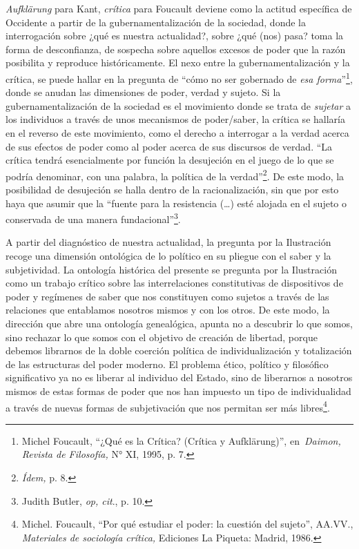 \emph{Aufklärung} para Kant, \emph{crítica} para Foucault deviene como la actitud específica de Occidente a partir de la gubernamentalización de la sociedad, donde la interrogación sobre ¿qué es nuestra actualidad?, sobre ¿qué (nos) pasa? toma la forma de desconfianza, de sospecha sobre aquellos excesos de poder que la razón posibilita y reproduce históricamente. El nexo entre la gubernamentalización y la crítica, se puede hallar en la pregunta de \enquote{cómo no ser gobernado de \emph{esa forma}}\footnote{Michel Foucault, \enquote{¿Qué es la Crítica? (Crítica y Aufklärung)}, en~\emph{Daimon, Revista de Filosofía,} N° XI, 1995, p. 7.}, donde se anudan las dimensiones de poder, verdad y sujeto. Si la gubernamentalización de la sociedad es el movimiento donde se trata de \emph{sujetar} a los individuos a través de unos mecanismos de poder/saber, la crítica se hallaría en el reverso de este movimiento, como el derecho a interrogar a la verdad acerca de sus efectos de poder como al poder acerca de sus discursos de verdad. \enquote{La crítica tendrá esencialmente por función la desujeción en el juego de lo que se podría denominar, con una palabra, la política de la verdad}\footnote{\emph{Ídem,} p. 8.}. De este modo, la posibilidad de desujeción se halla dentro de la racionalización, sin que por esto haya que asumir que la \enquote{fuente para la resistencia (\dots) esté alojada en el sujeto o conservada de una manera fundacional}\footnote{Judith Butler, \emph{op, cit}., p. 10.}.

A partir del diagnóstico de nuestra actualidad, la pregunta por la Ilustración recoge una dimensión ontológica de lo político en su pliegue con el saber y la subjetividad. La ontología histórica del presente se pregunta por la Ilustración como un trabajo crítico sobre las interrelaciones constitutivas de dispositivos de poder y regímenes de saber que nos constituyen como sujetos a través de las relaciones que entablamos nosotros mismos y con los otros. De este modo, la dirección que abre una ontología genealógica, apunta no a descubrir lo que somos, sino rechazar lo que somos con el objetivo de creación de libertad, porque debemos librarnos de la doble coerción política de individualización y totalización de las estructuras del poder moderno. El problema ético, político y filosófico significativo ya no es liberar al individuo del Estado, sino de liberarnos a nosotros mismos de estas formas de poder que nos han impuesto un tipo de individualidad a través de nuevas formas de subjetivación que nos permitan ser más libres\footnote{Michel. Foucault, \enquote{Por qué estudiar el poder: la cuestión del sujeto}, AA.VV., \emph{Materiales de sociología crítica,} Ediciones La Piqueta: Madrid, 1986.}.

